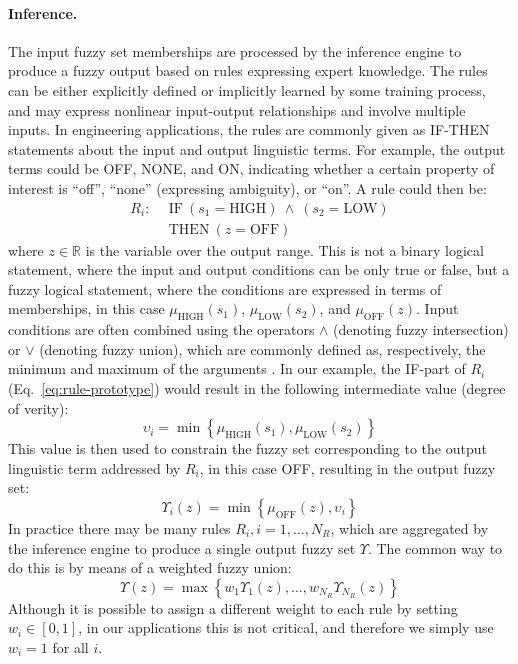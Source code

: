 \documentclass[twocolumn,natbib]{svjour3}
\begin{document}
\paragraph{Inference.} The input fuzzy set memberships are processed by the inference engine to produce a fuzzy output based on rules expressing expert knowledge. The rules can be either explicitly defined or implicitly learned by some training process, and may express nonlinear input-output relationships and involve multiple inputs. In engineering applications, the rules are commonly given as IF-THEN statements about the input and output linguistic terms. For example, the output terms could be OFF, NONE, and ON, indicating whether a certain property of interest is ``off'', ``none'' (expressing ambiguity), or ``on''. A rule could then be:
\begin{equation} 
\label{eq:rule-prototype}
\begin{split}
R_{i}\!:\ \ & \textrm{IF}\ (s_{1}=\textrm{HIGH})\ \wedge\ (s_{2}=\textrm{LOW}) \\
& \textrm{THEN}\ (z=\textrm{OFF})
\end{split}
\end{equation}
where $z\in\mathbb{R}$ is the variable over the output range. This is not a binary logical statement, where the input and output conditions can be only true or false, but a fuzzy logical statement, where the conditions are expressed in terms of memberships, in this case $\mu_{\textrm{HIGH}}(s_{1})$, $\mu_{\textrm{LOW}}(s_{2})$, and $\mu_{\textrm{OFF}}(z)$. Input conditions are often combined using the operators $\wedge$ (denoting fuzzy intersection) or $\vee$ (denoting fuzzy union), which are commonly defined as, respectively, the minimum and maximum of the arguments \citep{mendel1995fuzzy}. In our example, the IF-part of $R_{i}$ (Eq.~\ref{eq:rule-prototype}) would result in the following intermediate value (degree of verity):
\begin{equation}
\upsilon_{i} = \min\left\{\mu_{\textrm{HIGH}}(s_{1}),\mu_{\textrm{LOW}}(s_{2})\right\}
\end{equation}    
This value is then used to constrain the fuzzy set corresponding to the output linguistic term addressed by $R_{i}$, in this case OFF, resulting in the output fuzzy set:
\begin{equation}
\Upsilon_{\!i}(z) = \min\left\{\mu_{\textrm{OFF}}(z),\upsilon_{i}\right\}
\end{equation}
In practice there may be many rules $R_{i}, i=1,\dots,N_{R}$, which are aggregated by the inference engine to produce a single output fuzzy set $\Upsilon$. The common way to do this \citep{mendel1995fuzzy} is by means of a weighted fuzzy union:
\begin{equation}
\Upsilon(z) = \max\left\{w_{1}\Upsilon_{\!1}(z),\dots,w_{N_{R}}\Upsilon_{\!N_{R}}(z)\right\}
\end{equation}
Although it is possible to assign a different weight to each rule by setting $w_{i}\in[0,1]$, in our applications this is not critical, and therefore we simply use $w_{i}=1$ for all $i$.
\end{document}
